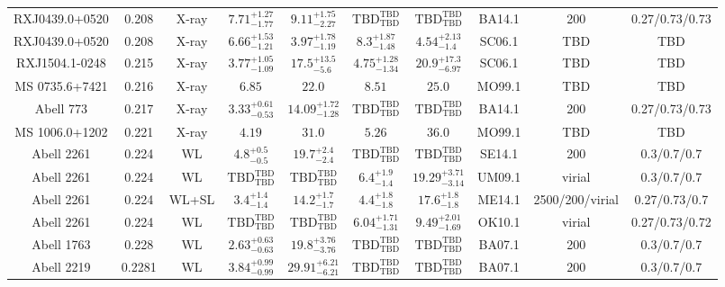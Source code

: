 \begin{table}
\begin{tabular}{cccccccccc}
RXJ0439.0+0520 & 0.208 & X-ray & ${7.71}^{+1.27}_{-1.77}$ & ${9.11}^{+1.75}_{-2.27}$ & ${\mathrm{TBD}}^{\mathrm{TBD}}_{\mathrm{TBD}}$ & ${\mathrm{TBD}}^{\mathrm{TBD}}_{\mathrm{TBD}}$ & BA14.1 & 200 & 0.27/0.73/0.73 \\
RXJ0439.0+0520 & 0.208 & X-ray & ${6.66}^{+1.53}_{-1.21}$ & ${3.97}^{+1.78}_{-1.19}$ & ${8.3}^{+1.87}_{-1.48}$ & ${4.54}^{+2.13}_{-1.4}$ & SC06.1 & TBD & TBD \\
RXJ1504.1-0248 & 0.215 & X-ray & ${3.77}^{+1.05}_{-1.09}$ & ${17.5}^{+13.5}_{-5.6}$ & ${4.75}^{+1.28}_{-1.34}$ & ${20.9}^{+17.3}_{-6.97}$ & SC06.1 & TBD & TBD \\
MS 0735.6+7421 & 0.216 & X-ray & ${6.85}^{}_{}$ & ${22.0}^{}_{}$ & ${8.51}^{}_{}$ & ${25.0}^{}_{}$ & MO99.1 & TBD & TBD \\
Abell 773 & 0.217 & X-ray & ${3.33}^{+0.61}_{-0.53}$ & ${14.09}^{+1.72}_{-1.28}$ & ${\mathrm{TBD}}^{\mathrm{TBD}}_{\mathrm{TBD}}$ & ${\mathrm{TBD}}^{\mathrm{TBD}}_{\mathrm{TBD}}$ & BA14.1 & 200 & 0.27/0.73/0.73 \\
MS 1006.0+1202 & 0.221 & X-ray & ${4.19}^{}_{}$ & ${31.0}^{}_{}$ & ${5.26}^{}_{}$ & ${36.0}^{}_{}$ & MO99.1 & TBD & TBD \\
Abell 2261 & 0.224 & WL & ${4.8}^{+0.5}_{-0.5}$ & ${19.7}^{+2.4}_{-2.4}$ & ${\mathrm{TBD}}^{\mathrm{TBD}}_{\mathrm{TBD}}$ & ${\mathrm{TBD}}^{\mathrm{TBD}}_{\mathrm{TBD}}$ & SE14.1 & 200 & 0.3/0.7/0.7 \\
Abell 2261 & 0.224 & WL & ${\mathrm{TBD}}^{\mathrm{TBD}}_{\mathrm{TBD}}$ & ${\mathrm{TBD}}^{\mathrm{TBD}}_{\mathrm{TBD}}$ & ${6.4}^{+1.9}_{-1.4}$ & ${19.29}^{+3.71}_{-3.14}$ & UM09.1 & virial & 0.3/0.7/0.7 \\
Abell 2261 & 0.224 & WL+SL & ${3.4}^{+1.4}_{-1.4}$ & ${14.2}^{+1.7}_{-1.7}$ & ${4.4}^{+1.8}_{-1.8}$ & ${17.6}^{+1.8}_{-1.8}$ & ME14.1 & 2500/200/virial & 0.27/0.73/0.7 \\
Abell 2261 & 0.224 & WL & ${\mathrm{TBD}}^{\mathrm{TBD}}_{\mathrm{TBD}}$ & ${\mathrm{TBD}}^{\mathrm{TBD}}_{\mathrm{TBD}}$ & ${6.04}^{+1.71}_{-1.31}$ & ${9.49}^{+2.01}_{-1.69}$ & OK10.1 & virial & 0.27/0.73/0.72 \\
Abell 1763 & 0.228 & WL & ${2.63}^{+0.63}_{-0.63}$ & ${19.8}^{+3.76}_{-3.76}$ & ${\mathrm{TBD}}^{\mathrm{TBD}}_{\mathrm{TBD}}$ & ${\mathrm{TBD}}^{\mathrm{TBD}}_{\mathrm{TBD}}$ & BA07.1 & 200 & 0.3/0.7/0.7 \\
Abell 2219 & 0.2281 & WL & ${3.84}^{+0.99}_{-0.99}$ & ${29.91}^{+6.21}_{-6.21}$ & ${\mathrm{TBD}}^{\mathrm{TBD}}_{\mathrm{TBD}}$ & ${\mathrm{TBD}}^{\mathrm{TBD}}_{\mathrm{TBD}}$ & BA07.1 & 200 & 0.3/0.7/0.7 \\

\end{tabular}
\end{table}
